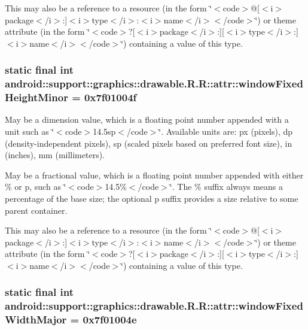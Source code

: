 This may also be a reference to a resource (in the form \char`\"{}$<$code$>$@\mbox{[}$<$i$>$package$<$/i$>$:\mbox{]}$<$i$>$type$<$/i$>$:$<$i$>$name$<$/i$>$$<$/code$>$\char`\"{}) or theme attribute (in the form \char`\"{}$<$code$>$?\mbox{[}$<$i$>$package$<$/i$>$:\mbox{]}\mbox{[}$<$i$>$type$<$/i$>$:\mbox{]}$<$i$>$name$<$/i$>$$<$/code$>$\char`\"{}) containing a value of this type. \hypertarget{classandroid_1_1support_1_1graphics_1_1drawable_1_1_r_1_1attr_42882eb170f071a9440984c7e98a127d}{
\subsubsection[{windowFixedHeightMinor}]{\setlength{\rightskip}{0pt plus 5cm}static final int android::support::graphics::drawable.R.R::attr::windowFixedHeightMinor = 0x7f01004f}}
\label{classandroid_1_1support_1_1graphics_1_1drawable_1_1_r_1_1attr_42882eb170f071a9440984c7e98a127d}


May be a dimension value, which is a floating point number appended with a unit such as \char`\"{}$<$code$>$14.5sp$<$/code$>$\char`\"{}. Available units are: px (pixels), dp (density-independent pixels), sp (scaled pixels based on preferred font size), in (inches), mm (millimeters). 

May be a fractional value, which is a floating point number appended with either \% or p, such as \char`\"{}$<$code$>$14.5\%$<$/code$>$\char`\"{}. The \% suffix always means a percentage of the base size; the optional p suffix provides a size relative to some parent container. 

This may also be a reference to a resource (in the form \char`\"{}$<$code$>$@\mbox{[}$<$i$>$package$<$/i$>$:\mbox{]}$<$i$>$type$<$/i$>$:$<$i$>$name$<$/i$>$$<$/code$>$\char`\"{}) or theme attribute (in the form \char`\"{}$<$code$>$?\mbox{[}$<$i$>$package$<$/i$>$:\mbox{]}\mbox{[}$<$i$>$type$<$/i$>$:\mbox{]}$<$i$>$name$<$/i$>$$<$/code$>$\char`\"{}) containing a value of this type. \hypertarget{classandroid_1_1support_1_1graphics_1_1drawable_1_1_r_1_1attr_ed96fac4ecab18a01738ef7fcc33573c}{
\subsubsection[{windowFixedWidthMajor}]{\setlength{\rightskip}{0pt plus 5cm}static final int android::support::graphics::drawable.R.R::attr::windowFixedWidthMajor = 0x7f01004e}}
\label{classandroid_1_1support_1_1graphics_1_1drawable_1_1_r_1_1attr_ed96fac4ecab18a01738ef7fcc33573c}



